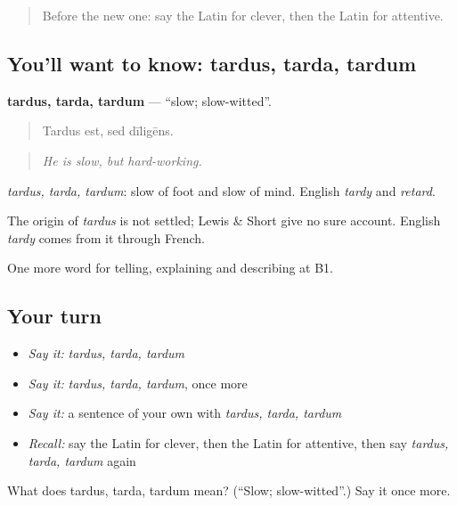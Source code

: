 \begin{quote}
Before the new one: say the Latin for clever, then the Latin for attentive.
\end{quote}

\subsection*{You'll want to know: tardus, tarda, tardum}
\textbf{tardus, tarda, tardum} — \textquotedblleft{}slow; slow-witted\textquotedblright{}.

\begin{quote}
Tardus est, sed dīligēns.
\end{quote}

\begin{quote}
\emph{He is slow, but hard-working.}
\end{quote}

\emph{tardus, tarda, tardum}: slow of foot and slow of mind. English \emph{tardy} and \emph{retard}.

\begin{cousinweb}
The origin of \emph{tardus} is not settled; Lewis \& Short give no sure account. English \emph{tardy} comes from it through French.
\end{cousinweb}

\begin{grammarlens}[title={What you've built}]
One more word for telling, explaining and describing at B1.
\end{grammarlens}

\subsection*{Your turn}
\begin{itemize}
\raggedright
  \item \emph{Say it:} \emph{tardus, tarda, tardum}
  \item \emph{Say it:} \emph{tardus, tarda, tardum}, once more
  \item \emph{Say it:} a sentence of your own with \emph{tardus, tarda, tardum}
  \item \emph{Recall:} say the Latin for clever, then the Latin for attentive, then say \emph{tardus, tarda, tardum} again
\end{itemize}

\begin{tcolorbox}[breakable,colback=teal!4,colframe=teal!35!black,title={Before you move on}]
What does tardus, tarda, tardum mean? (\textquotedblleft{}Slow; slow-witted\textquotedblright{}.) Say it once more.
\end{tcolorbox}
